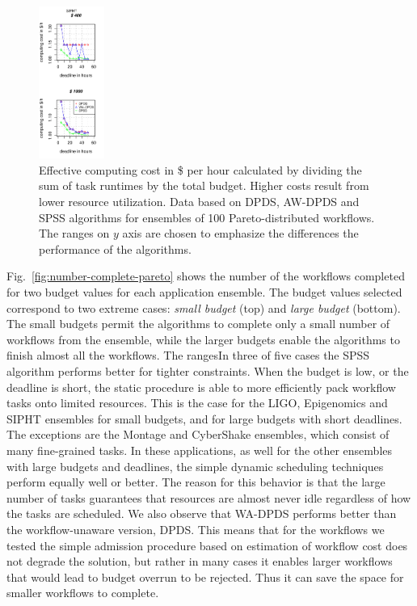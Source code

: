 \documentclass{sig-alternate}
\begin{document}
\begin{figure}[htb]
\includegraphics[width=0.19\textwidth]{figures/pareto-cost-SIPHT-n-1000-8-dagh5-50m0.pdf}
\caption{Effective computing cost in \$ per hour calculated by dividing the sum of
task runtimes by the total budget. Higher costs result from lower resource utilization. Data based on DPDS, AW-DPDS and SPSS algorithms for ensembles of 100
Pareto-distributed workflows. The ranges on $y$ axis are chosen to 
emphasize the differences the performance of the algorithms.}
\label{fig:cost}
\end{figure}

Fig.~\ref{fig:number-complete-pareto} shows the number of the workflows
completed for two budget values for each application ensemble. The budget values
selected correspond to two extreme cases: {\em small budget} (top) and {\em
large budget} (bottom). The small budgets permit the algorithms to complete 
only a small number of workflows from the ensemble, while the larger budgets 
enable the algorithms to finish almost all the workflows. The rangesIn three of
five cases the SPSS algorithm performs better for tighter constraints. When the 
budget is low, or the deadline is short, the static procedure is able to more 
efficiently pack workflow tasks onto limited resources. This is the case for 
the LIGO, Epigenomics and SIPHT ensembles for small budgets, and for large
budgets with short deadlines. The exceptions are the Montage and CyberShake 
ensembles,  which consist of many fine-grained tasks. In these applications, 
as well for the other ensembles with large budgets and deadlines, the simple 
dynamic scheduling techniques perform equally well or better. The reason for 
this behavior is that the large number of tasks guarantees that resources 
are almost never idle regardless of how the tasks are scheduled. We also 
observe that WA-DPDS performs better than the workflow-unaware version, DPDS. 
This means that for the workflows we tested the simple admission procedure based 
on estimation of workflow cost does not degrade the solution, but rather in 
many cases it enables larger workflows that would lead to budget overrun to
be rejected. Thus it can save the space for smaller workflows to complete.
\end{document}
